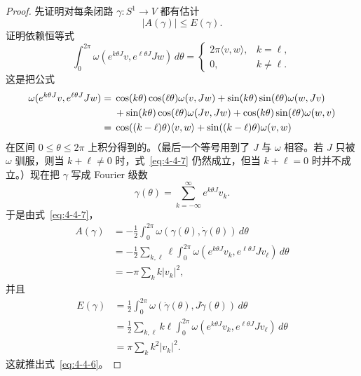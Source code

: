 \begin{proof}
先证明对每条闭路 $\gamma:S^1\to V$ 都有估计
\begin{equation}\label{eq:4-4-6}
  |A(\gamma)|\le E(\gamma).
\end{equation}
证明依赖恒等式
\begin{equation}\label{eq:4-4-7}
  \int_0^{2\pi}\omega(e^{k\theta J}v,e^{\ell\theta J}Jw)\,d\theta
  =
  \begin{cases}
    2\pi\langle v,w\rangle,&k=\ell,\\
    0,&k\ne\ell.
  \end{cases}
\end{equation}
这是把公式
\begin{align}
  \omega(e^{k\theta J}v,e^{\ell\theta J}Jw)
  ={}&\cos(k\theta)\cos(\ell\theta)\omega(v,Jw)
  +\sin(k\theta)\sin(\ell\theta)\omega(w,Jv)\notag\\
  &+\sin(k\theta)\cos(\ell\theta)\omega(Jv,Jw)
  +\cos(k\theta)\sin(\ell\theta)\omega(w,v)\notag\\
  ={}&\cos((k-\ell)\theta)\langle v,w\rangle
  +\sin((k-\ell)\theta)\omega(v,w)
  \label{eq:4-4-8}
\end{align}
在区间 $0\le\theta\le2\pi$ 上积分得到的。（最后一个等号用到了 $J$ 与 $\omega$
相容。若 $J$ 只被 $\omega$ 驯服，则当 $k+\ell\ne0$ 时，式~\eqref{eq:4-4-7}
仍然成立，但当 $k+\ell=0$ 时并不成立。）现在把 $\gamma$ 写成 Fourier 级数
\begin{equation}\label{eq:4-4-9}
  \gamma(\theta)=\sum_{k=-\infty}^{\infty}e^{k\theta J}v_k.
\end{equation}
于是由式~\eqref{eq:4-4-7}，
\[
  \begin{aligned}
  A(\gamma)
  &=-\frac12\int_0^{2\pi}
    \omega(\gamma(\theta),\dot\gamma(\theta))\,d\theta\\
  &=-\frac12\sum_{k,\ell}\ell\int_0^{2\pi}
    \omega(e^{k\theta J}v_k,e^{\ell\theta J}Jv_\ell)\,d\theta\\
  &=-\pi\sum_k k|v_k|^2,
  \end{aligned}
\]
并且
\[
  \begin{aligned}
  E(\gamma)
  &=\frac12\int_0^{2\pi}
    \omega(\dot\gamma(\theta),J\dot\gamma(\theta))\,d\theta\\
  &=\frac12\sum_{k,\ell}k\ell\int_0^{2\pi}
    \omega(e^{k\theta J}v_k,e^{\ell\theta J}Jv_\ell)\,d\theta\\
  &=\pi\sum_k k^2|v_k|^2.
  \end{aligned}
\]
这就推出式~\eqref{eq:4-4-6}。


\end{proof}
